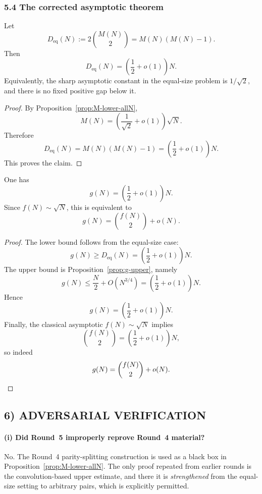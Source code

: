 \subsubsection{5.4 The corrected asymptotic theorem}

\begin{theorem}
\label{thm:eq-corrected}
Let
\[
D_{\mathrm{eq}}(N):=2\binom{M(N)}{2}=M(N)(M(N)-1).
\]
Then
\[
D_{\mathrm{eq}}(N)=\left(\frac12+o(1)\right)N.
\]
Equivalently, the sharp asymptotic constant in the equal-size problem is $1/\sqrt2$, and there is no fixed positive gap below it.
\end{theorem}

\begin{proof}
By Proposition~\ref{prop:M-lower-allN},
\[
M(N)=\left(\frac1{\sqrt2}+o(1)\right)\sqrt N.
\]
Therefore
\[
D_{\mathrm{eq}}(N)=M(N)(M(N)-1)=\left(\frac12+o(1)\right)N.
\]
This proves the claim.
\end{proof}

\begin{theorem}
\label{thm:g-corrected}
One has
\[
g(N)=\left(\frac12+o(1)\right)N.
\]
Since $f(N)\sim \sqrt N$, this is equivalent to
\[
g(N)=\binom{f(N)}{2}+o(N).
\]
\end{theorem}

\begin{proof}
The lower bound follows from the equal-size case:
\[
g(N)\ge D_{\mathrm{eq}}(N)=\left(\frac12+o(1)\right)N.
\]
The upper bound is Proposition~\ref{prop:g-upper}, namely
\[
g(N)\le \frac N2+O(N^{3/4})=\left(\frac12+o(1)\right)N.
\]
Hence
\[
g(N)=\left(\frac12+o(1)\right)N.
\]
Finally, the classical asymptotic $f(N)\sim \sqrt N$ implies
\[
\binom{f(N)}2=\left(\frac12+o(1)\right)N,
\]
so indeed
\[
g(N)=\binom{f(N)}2+o(N).
\qedhere
\]
\end{proof}

\subsection{6) ADVERSARIAL VERIFICATION}

\paragraph{(i) Did Round~5 improperly reprove Round~4 material?}
No.  The Round~4 parity-splitting construction is used as a black box in Proposition~\ref{prop:M-lower-allN}.  The only proof repeated from earlier rounds is the convolution-based upper estimate, and there it is \emph{strengthened} from the equal-size setting to arbitrary pairs, which is explicitly permitted.


